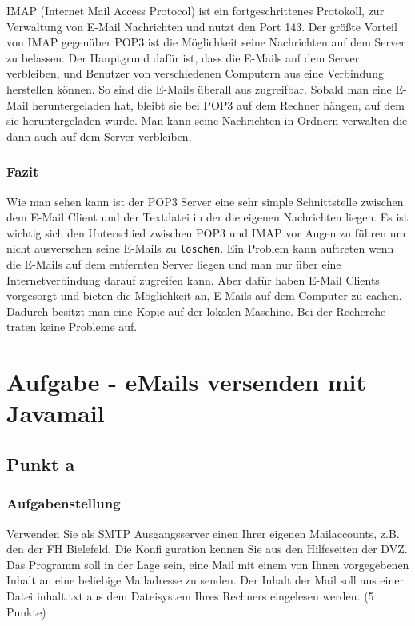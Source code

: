 IMAP (Internet Mail Access Protocol) ist ein fortgeschrittenes Protokoll, zur Verwaltung von E-Mail Nachrichten und nutzt den Port 143. Der größte Vorteil von IMAP gegenüber POP3 ist die Möglichkeit seine Nachrichten auf dem Server zu belassen.\newline
Der Hauptgrund dafür ist, dass die E-Mails auf dem Server verbleiben, und Benutzer von verschiedenen Computern aus eine Verbindung herstellen können. So sind die E-Mails überall aus zugreifbar.\newline
Sobald man eine E-Mail heruntergeladen hat, bleibt sie bei POP3 auf dem Rechner hängen, auf dem sie heruntergeladen wurde.\newline
Man kann seine Nachrichten in Ordnern verwalten die dann auch auf dem Server verbleiben.\newline\newline


	\subsubsection{\textbf{Fazit}}
	Wie man sehen kann ist der POP3 Server eine sehr simple Schnittstelle zwischen dem E-Mail Client und der Textdatei in der die eigenen Nachrichten liegen.
\newline
Es ist wichtig sich den Unterschied zwischen POP3 und IMAP vor Augen zu führen um nicht ausversehen seine E-Mails zu \verb|löschen|.
Ein Problem kann auftreten wenn die E-Mails auf dem entfernten Server liegen und man nur über eine Internetverbindung darauf zugreifen kann. Aber dafür haben E-Mail Clients vorgesorgt und bieten die Möglichkeit an, E-Mails auf dem Computer zu cachen.
Dadurch besitzt man eine Kopie auf der lokalen Maschine.
Bei der Recherche traten keine Probleme auf.

	
\section{\Large Aufgabe - eMails versenden mit Javamail}
	\subsection{\large Punkt a}
		\subsubsection{\textbf{Aufgabenstellung}}
		Verwenden Sie als SMTP Ausgangsserver einen Ihrer eigenen Mailaccounts, z.B. den der
FH Bielefeld. Die Konfiguration kennen Sie aus den Hilfeseiten der DVZ. Das Programm
soll in der Lage sein, eine Mail mit einem von Ihnen vorgegebenen Inhalt an eine beliebige
Mailadresse zu senden. Der Inhalt der Mail soll aus einer Datei inhalt.txt aus dem
Dateisystem Ihres Rechners eingelesen werden. (5 Punkte)
